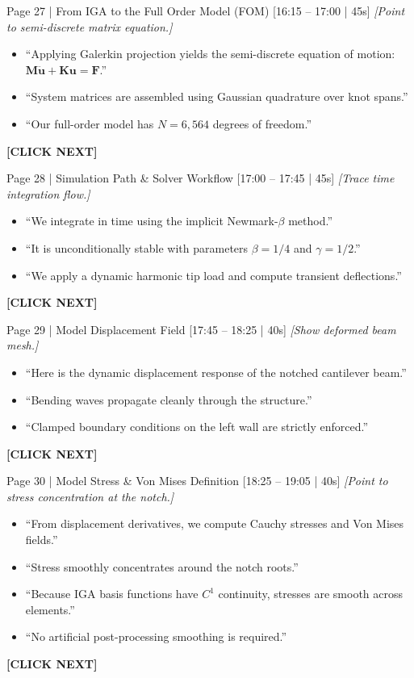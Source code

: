 \documentclass[9pt,a4paper]{article}
\begin{document}
\begin{slidebox}{Page 27 | From IGA to the Full Order Model (FOM) \hfill [16:15 -- 17:00 | 45s]}
\textit{[Point to semi-discrete matrix equation.]}
\begin{itemize}
  \item ``Applying Galerkin projection yields the semi-discrete equation of motion: $\mathbf{M}\ddot{\mathbf{u}} + \mathbf{K}\mathbf{u} = \mathbf{F}$.''
  \item ``System matrices are assembled using Gaussian quadrature over knot spans.''
  \item ``Our full-order model has $N = 6{,}564$ degrees of freedom.''
\end{itemize}
\textbf{\color{cnamred}[CLICK NEXT]}
\end{slidebox}

\begin{slidebox}{Page 28 | Simulation Path \& Solver Workflow \hfill [17:00 -- 17:45 | 45s]}
\textit{[Trace time integration flow.]}
\begin{itemize}
  \item ``We integrate in time using the implicit Newmark-$\beta$ method.''
  \item ``It is unconditionally stable with parameters $\beta = 1/4$ and $\gamma = 1/2$.''
  \item ``We apply a dynamic harmonic tip load and compute transient deflections.''
\end{itemize}
\textbf{\color{cnamred}[CLICK NEXT]}
\end{slidebox}

\begin{slidebox}{Page 29 | Model Displacement Field \hfill [17:45 -- 18:25 | 40s]}
\textit{[Show deformed beam mesh.]}
\begin{itemize}
  \item ``Here is the dynamic displacement response of the notched cantilever beam.''
  \item ``Bending waves propagate cleanly through the structure.''
  \item ``Clamped boundary conditions on the left wall are strictly enforced.''
\end{itemize}
\textbf{\color{cnamred}[CLICK NEXT]}
\end{slidebox}

\begin{slidebox}{Page 30 | Model Stress \& Von Mises Definition \hfill [18:25 -- 19:05 | 40s]}
\textit{[Point to stress concentration at the notch.]}
\begin{itemize}
  \item ``From displacement derivatives, we compute Cauchy stresses and Von Mises fields.''
  \item ``Stress smoothly concentrates around the notch roots.''
  \item ``Because IGA basis functions have $C^1$ continuity, stresses are smooth across elements.''
  \item ``No artificial post-processing smoothing is required.''
\end{itemize}
\textbf{\color{cnamred}[CLICK NEXT]}
\end{slidebox}
\end{document}
